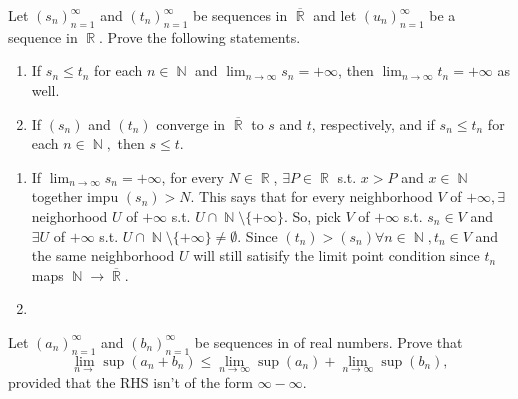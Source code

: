 \documentclass[12pt,letterpaper,boxed]{hmcpset}
\DeclareMathOperator{\N}{\mathbb{N}}
\DeclareMathOperator{\R}{\mathbb{R}}
\begin{document}
\begin{problem}[Exercise 4.2]
Let $(s_n)_{n=1}^{\infty}$ and $(t_n)_{n=1}^{\infty}$ be sequences in $\overline{\R}$ and let $(u_n)_{n=1}^{\infty}$ be a sequence in $\R$. Prove the following statements.
\vspace{-2mm}
    \begin{enumerate}
        \itemsep0em
        \item If $s_n \leq t_n$ for each $n\in\N$ and $\lim_{n\rightarrow \infty} s_n = + \infty$, then $\lim_{n\rightarrow \infty} t_n = + \infty$ as well.
        \item If $(s_n)$ and $(t_n)$ converge in $\overline{\R}$ to $s$ and $t$, respectively, and if $s_n \leq t_n$ for each $n\in\N,$ then $s \leq t.$
    \end{enumerate}
\end{problem}

\begin{solution}
\begin{enumerate}
        \itemsep0em
        \item If $\lim_{n\rightarrow\infty} s_n = +\infty$, for every $N \in \R$, $\exists P \in \R$ s.t. $x>P$ and $x\in\N$ together impu $(s_n) > N.$ This says that for every neighborhood $V$ of $+\infty, \exists$ neighorhood $U$ of $+\infty$ s.t. $U\cap\N\setminus \{+\infty\}$. So, pick $V$ of $+\infty$ s.t. $s_n\in V$ and $\exists U$ of $+\infty$ s.t. $U\cap\N\setminus \{+\infty\}\neq\emptyset$. Since $(t_n) > (s_n) \forall n\in\N, t_n \in V$ and the same neighborhood $U$ will still satisify the limit point condition since $t_n$ maps $\N\rightarrow\overline{\R}.$
        \item
    \end{enumerate}
\end{solution}

\begin{problem}[Exercise 4.2]
Let $(a_n)_{n=1}^{\infty}$ and $(b_n)_{n=1}^{\infty}$ be sequences in of real numbers. Prove that $$\lim_{n \rightarrow} \sup(a_n + b_n) \leq \lim_{n \rightarrow \infty} \sup(a_n) + \lim_{n \rightarrow \infty} \sup(b_n),$$ provided that the RHS isn't of the form $\infty - \infty$.
\end{problem}

\begin{solution}

\end{solution}
\end{document}
